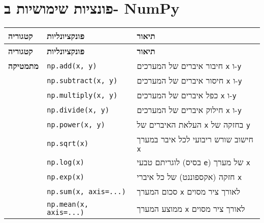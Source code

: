 \documentclass[a4paper, 12pt]{article}
\begin{document}
\section*{פונציות שימושיות ב- NumPy}

\begin{longtable}{|p{}|p{}|p{}|}
\hline
\textbf{קטגוריה} & \textbf{פונקציונליות} & \textbf{תיאור} \\
\hline
\endfirsthead
\hline
\textbf{קטגוריה} & \textbf{פונקציונליות} & \textbf{תיאור} \\
\hline
\endhead
\hline
\endfoot

\hline
\endlastfoot

\textbf{מתמטיקה} & \textenglish{\texttt{np.add(x, y)}} & חיבור איברים של המערכים \textenglish{\texttt{x}} ו-\textenglish{\texttt{y}} \\
                 & \textenglish{\texttt{np.subtract(x, y)}} & חיסור איברים של המערכים \textenglish{\texttt{x}} ו-\textenglish{\texttt{y}} \\
                 & \textenglish{\texttt{np.multiply(x, y)}} & כפל איברים של המערכים \textenglish{\texttt{x}} ו-\textenglish{\texttt{y}} \\
                 & \textenglish{\texttt{np.divide(x, y)}} & חילוק איברים של המערכים \textenglish{\texttt{x}} ו-\textenglish{\texttt{y}} \\
                 & \textenglish{\texttt{np.power(x, y)}} & העלאת האיברים של \textenglish{\texttt{x}} בחזקה של \textenglish{\texttt{y}} \\
                 & \textenglish{\texttt{np.sqrt(x)}} & חישוב שורש ריבועי לכל איבר במערך \textenglish{\texttt{x}} \\
                 & \textenglish{\texttt{np.log(x)}} & לוגריתם טבעי (בסיס \textenglish{\texttt{e}}) של מערך \textenglish{\texttt{x}} \\
                 & \textenglish{\texttt{np.exp(x)}} & חזקה (אקספוננט) של כל איברי \textenglish{\texttt{x}} \\
                 & \textenglish{\texttt{np.sum(x, axis=...)}} & סכום המערך \textenglish{\texttt{x}} לאורך ציר מסוים \\
                 & \textenglish{\texttt{np.mean(x, axis=...)}} & ממוצע המערך \textenglish{\texttt{x}} לאורך ציר מסוים \\

\hline


\end{longtable}
\end{document}
